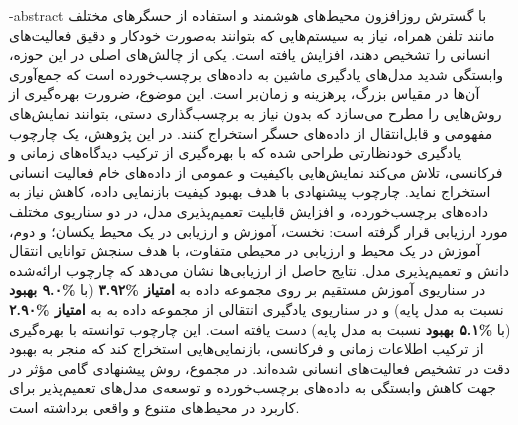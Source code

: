 
\fa-abstract{
با گسترش روزافزون محیط‌های هوشمند و استفاده از حسگرهای مختلف مانند تلفن همراه، نیاز به سیستم‌هایی که بتوانند به‌صورت خودکار و دقیق فعالیت‌های انسانی را تشخیص دهند، افزایش یافته است. یکی از چالش‌های اصلی در این حوزه، وابستگی شدید مدل‌های یادگیری ماشین به داده‌های برچسب‌خورده است که جمع‌آوری آن‌ها در مقیاس بزرگ، پرهزینه و زمان‌بر است. این موضوع، ضرورت بهره‌گیری از روش‌هایی را مطرح می‌سازد که بدون نیاز به برچسب‌گذاری دستی، بتوانند نمایش‌های مفهومی و قابل‌انتقال از داده‌های حسگر استخراج کنند. در این پژوهش، یک چارچوب یادگیری خودنظارتی طراحی شده که با بهره‌گیری از ترکیب دیدگاه‌های زمانی و فرکانسی، تلاش می‌کند نمایش‌هایی باکیفیت و عمومی از داده‌های خام فعالیت انسانی استخراج نماید. چارچوب پیشنهادی با هدف بهبود کیفیت بازنمایی داده، کاهش نیاز به داده‌های برچسب‌خورده، و افزایش قابلیت تعمیم‌پذیری مدل، در دو سناریوی مختلف مورد ارزیابی قرار گرفته است: نخست، آموزش و ارزیابی در یک محیط یکسان؛ و دوم، آموزش در یک محیط و ارزیابی در محیطی متفاوت، با هدف سنجش توانایی انتقال دانش و تعمیم‌پذیری مدل.
نتایج حاصل از ارزیابی‌ها نشان می‌دهد که چارچوب ارائه‌شده در سناریوی آموزش مستقیم بر روی مجموعه داده  به \textbf{امتیاز  \%۳.۹۲} (با \textbf{\%۹.۰ بهبود} نسبت به مدل پایه) و در سناریوی یادگیری انتقالی از مجموعه داده  به  به \textbf{امتیاز  \%۲.۹۰} (با \textbf{\%۵.۱ بهبود} نسبت به مدل پایه) دست یافته است.
این چارچوب توانسته با بهره‌گیری از ترکیب اطلاعات زمانی و فرکانسی، بازنمایی‌هایی استخراج کند که منجر به بهبود دقت در تشخیص فعالیت‌های انسانی شده‌اند. در مجموع، روش پیشنهادی گامی مؤثر در جهت کاهش وابستگی به داده‌های برچسب‌خورده و توسعه‌ی مدل‌های تعمیم‌پذیر برای کاربرد در محیط‌های متنوع و واقعی برداشته است.
}


